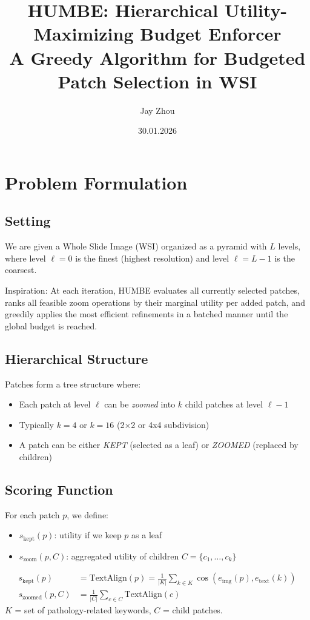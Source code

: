 \documentclass[11pt]{article}
\title{HUMBE: Hierarchical Utility-Maximizing Budget Enforcer\\
\large A Greedy Algorithm for Budgeted Patch Selection in WSI}
\author{Jay Zhou}
\date{30.01.2026}
\begin{document}
\maketitle

\section{Problem Formulation}

\subsection{Setting}
We are given a Whole Slide Image (WSI) organized as a pyramid with $L$ levels, where level $\ell = 0$ is the finest (highest resolution) and level $\ell = L-1$ is the coarsest.

Inspiration: At each iteration, HUMBE evaluates all currently selected patches, ranks all feasible zoom operations by their marginal utility per added patch, and greedily applies the most efficient refinements in a batched manner until the global budget is reached.

\subsection{Hierarchical Structure}
Patches form a tree structure where:
\begin{itemize}[nosep]
    \item Each patch at level $\ell$ can be \emph{zoomed} into $k$ child patches at level $\ell - 1$
    \item Typically $k = 4$ or $k = 16$ (2×2 or 4x4 subdivision)
    \item A patch can be either \emph{KEPT} (selected as a leaf) or \emph{ZOOMED} (replaced by children)
\end{itemize}

\subsection{Scoring Function}
For each patch $p$, we define:
\begin{itemize}[nosep]
    \item $s_{\text{kept}}(p)$: utility if we keep $p$ as a leaf
    \item $s_{\text{zoom}}(p, C)$: aggregated utility of children $C = \{c_1, \ldots, c_k\}$
\end{itemize}

\begin{align}
s_{\text{kept}}(p) &= \text{TextAlign}(p) = \frac{1}{|K|} \sum_{k \in K} \cos(e_{\text{img}}(p), e_{\text{text}}(k)) \\
s_{\text{zoomed}}(p, C) &= \frac{1}{|C|} \sum_{c \in C} \text{TextAlign}(c)
\end{align}
$K$ = set of pathology-related keywords, $C$ = child patches.
\end{document}
